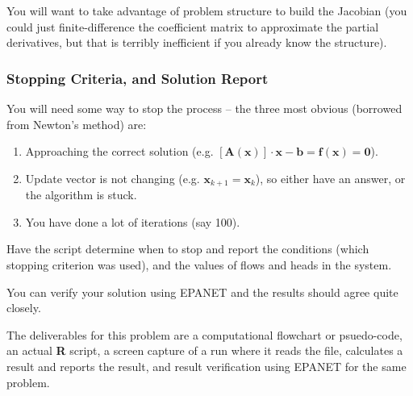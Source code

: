 You will want to take advantage of problem structure to build the Jacobian (you could just finite-difference the coefficient matrix to approximate the partial derivatives, but that is terribly inefficient if you already know the structure).

\subsubsection{Stopping Criteria, and Solution Report}
You will need some way to stop the process -- the three most obvious (borrowed from Newton's method) are:
\begin{enumerate}
\item Approaching the correct solution (e.g. $[\mathbf{A}(\mathbf{x})] \cdot \mathbf{x} - \mathbf{b} = \mathbf{f}(\mathbf{x}) = \mathbf{0}$).
\item Update vector is not changing (e.g. $\mathbf{x}_{k+1}=\mathbf{x}_{k}$), so either have an answer, or the algorithm is stuck.
\item You have done a lot of iterations (say 100).
\end{enumerate}

Have the script determine when to stop and report the conditions (which stopping criterion was used), and the values of flows and heads in the system.

You can verify your solution using EPANET and the results should agree quite closely.

The deliverables for this problem are a computational flowchart or psuedo-code, an actual \textbf{R} script, a screen capture of a run where it reads the file, calculates a result and reports the result, and result verification using EPANET for the same problem.


\clearpage
